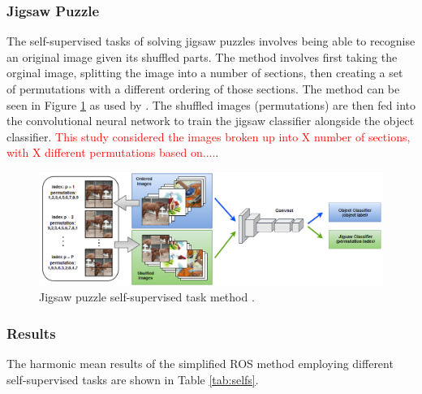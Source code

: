 \documentclass[10pt,twocolumn,letterpaper]{article}
\begin{document}
\subsubsection*{Jigsaw Puzzle}

The self-supervised tasks of solving jigsaw puzzles involves being able to recognise an original image given its shuffled parts. The method involves first taking the orginal image, splitting the image into a number of sections, then creating a set of permutations with a different ordering of those sections. The method can be seen in Figure \ref{fig:jigsaw} as used by \cite{Carlucci2019}. The shuffled images (permutations) are then fed into the convolutional neural network to train the jigsaw classifier alongside the object classifier. \textcolor{red}{This study considered the images broken up into X number of sections, with X different permutations based on....}.

\begin{figure}[!htb]
  \centering
   \includegraphics[width=0.95\linewidth]{Figures/Jigsaw.png}
   \caption{Jigsaw puzzle self-supervised task method \cite{Carlucci2019}.}
   \label{fig:jigsaw}
\end{figure}

\subsubsection*{Results}

The harmonic mean results of the simplified ROS method employing different self-supervised tasks are shown in Table \ref{tab:selfs}.
\end{document}
